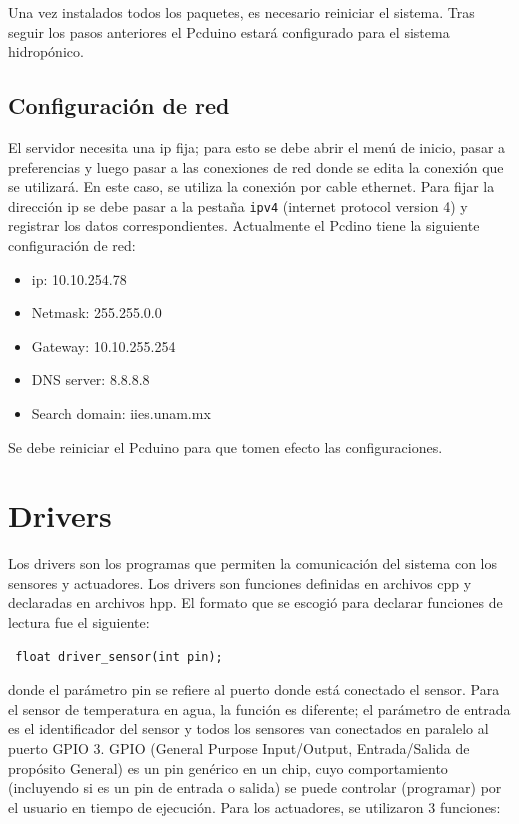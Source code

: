 \documentclass[a4paper,10pt,titlepage]{article}
\begin{document}
Una vez instalados todos los paquetes, es necesario reiniciar el sistema. Tras seguir los pasos anteriores el Pcduino estar\'a configurado para el sistema hidrop\'onico.

\subsection{Configuraci\'on de red}
El servidor necesita una ip fija; para esto se debe abrir el men\'u de inicio, pasar a 
preferencias y luego pasar a las conexiones de red donde se edita la conexi\'on que se utilizar\'a. En este caso, se utiliza la conexi\'on por cable ethernet. 
Para fijar la direcci\'on ip se debe pasar a 
la pesta\~na \verb|ipv4| (internet protocol 
version 4) y registrar los datos correspondientes. Actualmente el Pcdino tiene la siguiente configuraci\'on de red:

\begin{itemize}
	\item ip: 10.10.254.78
	\item Netmask: 255.255.0.0
	\item Gateway: 10.10.255.254
	\item DNS server: 8.8.8.8
	\item Search domain: iies.unam.mx
\end{itemize}

Se debe reiniciar el Pcduino para que tomen efecto las configuraciones.

\section{Drivers}
Los drivers son los programas que permiten la comunicaci\'on del sistema con los sensores y 
actuadores. Los drivers son funciones definidas en archivos cpp y declaradas en archivos hpp. El formato 
que se escogi\'o para declarar
funciones de lectura fue el siguiente: 

\begin{verbatim}
 float driver_sensor(int pin);
\end{verbatim}

donde el par\'ametro pin se refiere al puerto donde est\'a conectado el 
sensor. Para el sensor de temperatura en agua, la funci\'on es diferente; 
el par\'ametro de entrada es el identificador del sensor y todos los 
sensores van conectados en paralelo al puerto GPIO 3. GPIO (General Purpose Input/Output, Entrada/Salida de prop\'osito General) es un pin gen\'erico en un chip, 
cuyo 
comportamiento (incluyendo si es un pin
de entrada o salida) se puede controlar (programar) por el usuario en tiempo de ejecuci\'on. Para los 
actuadores, se utilizaron 3 funciones:
\end{document}
